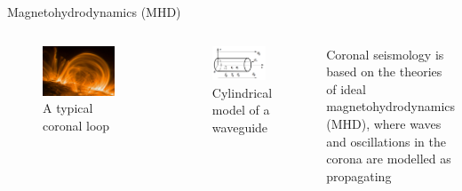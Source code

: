 \documentclass[t]{beamer}
\begin{document}
\begin{frame}[t]
\begin{block}{}
\begin{columns}
        \begin{block}{Magnetohydrodynamics (MHD)}
            \begin{columns}
                \begin{figure}
                    \includegraphics[width=0.9\textwidth]{../loop.jpg}
                    \caption{A typical coronal loop}
                \end{figure}
                \begin{figure}
                    \includegraphics[width=0.9\textwidth]{../cylinder.png}
                    \caption{Cylindrical model of a waveguide}
                \end{figure}
                \par\vspace{20pt}
                Coronal seismology is based on the theories of
                ideal magnetohydrodynamics (MHD), where
                waves and oscillations in the corona are modelled as propagating

\end{columns}
\end{block}
\end{columns}
\end{block}
\end{frame}
\end{document}
